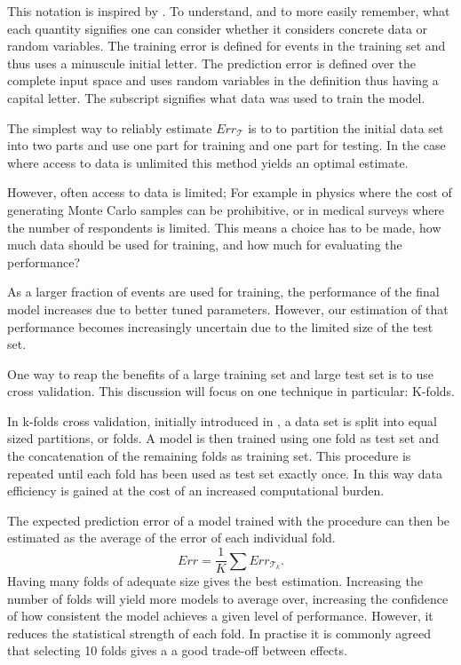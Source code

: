 This notation is inspired by \cite{Hastie01a}. To understand, and to more easily remember, what each quantity signifies one can consider whether it considers concrete data or random variables. The training error is defined for events in the training set and thus uses a minuscule initial letter. The prediction error is defined over the complete input space and uses random variables in the definition thus having a capital letter.
The subscript signifies what data was used to train the model.

The simplest way to reliably estimate $Err_{\mathcal{T}}$ is to to partition the initial data set into two parts and use one part for training and one part for testing. In the case where access to data is unlimited this method yields an optimal estimate.

However, often access to data is limited; For example in physics where the cost of generating Monte Carlo samples can be prohibitive, or in medical surveys where the number of respondents is limited. This means a choice has to be made, how much data should be used for training, and how much for evaluating the performance?

As a larger fraction of events are used for training, the performance of the final model increases due to better tuned parameters. However, our estimation of that performance becomes increasingly uncertain due to the limited size of the test set.

One way to reap the benefits of a large training set and large test set is to use cross validation. This discussion will focus on one technique in particular: K-folds.

In k-folds cross validation, initially introduced in \cite{Geisser75}, a data set is split into equal sized partitions, or folds. A model is then trained using one fold as test set and the concatenation of the remaining folds as training set. This procedure is repeated until each fold has been used as test set exactly once. In this way data efficiency is gained at the cost of an increased computational burden.

The expected prediction error of a model trained with the procedure can then be estimated as the average of the error of each individual fold.
\begin{equation}
   Err = \frac{1}{K} \sum Err_{\mathcal{T}_k}.
\end{equation}
Having many folds of adequate size gives the best estimation. Increasing the number of folds will yield more models to average over, increasing the confidence of how consistent the model achieves a given level of performance. However, it reduces the statistical strength of each fold. In practise it is commonly agreed that selecting 10 folds gives a a good trade-off between effects.

